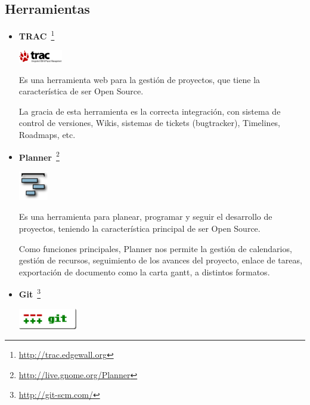 \subsection{Herramientas}

\begin{itemize}
	\item \textbf{TRAC}~\footnote{\url{http://trac.edgewall.org}}
	
	\begin{center}
    	\includegraphics[width=0.15\textwidth]{../3-workshop/1-metodologia/img/trac}
	\end{center}

	Es una herramienta web para la gestión de proyectos,
	que tiene la característica de ser Open Source.

	La gracia de esta herramienta es la correcta integración,
	con sistema de control de versiones, Wikis, sistemas
	de tickets (bugtracker), Timelines, Roadmaps, etc.

	\item \textbf{Planner}~\footnote{\url{http://live.gnome.org/Planner}}

	\begin{center}
	    \includegraphics[width=0.1\textwidth]{../3-workshop/1-metodologia/img/planner}
	\end{center}

	Es una herramienta para planear, programar y seguir el desarrollo de proyectos,
	teniendo la característica principal de ser Open Source.

	Como funciones principales, Planner nos permite la gestión de calendarios,
	gestión de recursos, seguimiento  de los avances del proyecto, enlace de tareas,
	exportación de documento como la carta gantt, a distintos formatos.
	
	\item \textbf{Git}~\footnote{\url{http://git-scm.com/}}

	\begin{center}
	    \includegraphics[width=0.2\textwidth]{../3-workshop/1-metodologia/img/git}
	\end{center}



\end{itemize}
